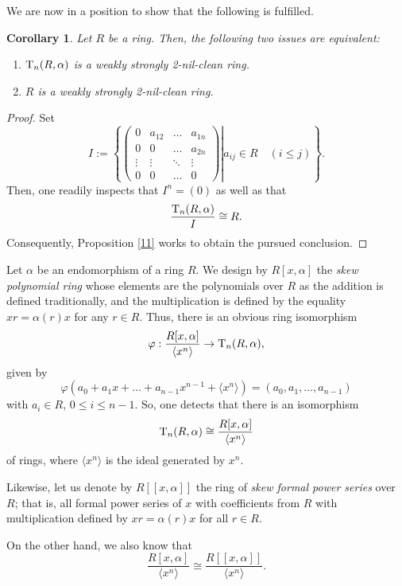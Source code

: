 \documentclass[12pt]{amsart}
\newtheorem{corollary}[theorem]{Corollary}
\theoremstyle{definition}
\begin{document}
\medskip

We are now in a position to show that the following is fulfilled.

\begin{corollary}\label{2.20}
Let $R$ be a ring. Then, the following two issues are equivalent:
\begin{enumerate}
\item
${\rm T}_{n}(R,\alpha)$ is a weakly strongly 2-nil-clean ring.
\item
$R$ is a weakly strongly 2-nil-clean ring.
\end{enumerate}
\end{corollary}

\begin{proof}
Set
$$I:=\left\{
\left.
\begin{pmatrix}
		0 & a_{12} & \ldots & a_{1n} \\
		0 & 0 & \ldots & a_{2n} \\
		\vdots & \vdots & \ddots & \vdots \\
		0 & 0 & \ldots & 0
	\end{pmatrix} \right| a_{ij}\in R \quad (i\leq j )
	\right\}.$$
Then, one readily inspects that $I^{n}=(0)$ as well as that $$\dfrac{{\rm T}_{n}(R,\alpha )}{I} \cong R.$$ Consequently, Proposition \ref{11} works to obtain the pursued conclusion.
\end{proof}

Let $\alpha$ be an endomorphism of a ring $R$. We design by $R[x,\alpha ]$ the {\it skew polynomial ring} whose elements are the polynomials over $R$ as the addition is defined traditionally, and the multiplication is defined by the equality $xr=\alpha (r)x$ for any $r\in R$. Thus, there is an obvious ring isomorphism $$\varphi : \dfrac{R[x,\alpha]}{\langle x^{n}\rangle }\rightarrow {\rm T}_{n}(R,\alpha),$$ given by $$\varphi (a_{0}+a_{1}x+\ldots +a_{n-1}x^{n-1}+\langle x^{n} \rangle )=(a_{0},a_{1},\ldots ,a_{n-1})$$ with $a_{i}\in R$, $0\leq i\leq n-1$. So, one detects that there is an isomorphism $${\rm T}_{n}(R,\alpha )\cong \dfrac{R[x,\alpha ]}{\langle  x^{n}\rangle}$$ of rings, where $\langle x^{n}\rangle$ is the ideal generated by $x^{n}$. 

Likewise, let us denote by $R[[x, \alpha]]$ the ring of {\it skew formal power series} over $R$; that is, all formal power series of $x$ with coefficients from $R$ with multiplication defined by $xr = \alpha(r)x$ for all $r \in R$. 

On the other hand, we also know that $$\dfrac{R[x,\alpha ]}{\langle x^{n}\rangle}\cong \dfrac{R[[x,\alpha ]]}{\langle x^{n}\rangle}.$$
\end{document}
